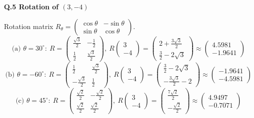 \medskip\noindent\textbf{Q.5  Rotation of $(3,-4)$}\par\smallskip
Rotation matrix $R_\theta=\begin{pmatrix}\cos\theta&-\sin\theta\\\sin\theta&\cos\theta\end{pmatrix}$.
\[ \text{(a) }\theta=30^\circ:\ R=\begin{pmatrix}\frac{\sqrt{3}}{2} & - \frac{1}{2} \\ \frac{1}{2} & \frac{\sqrt{3}}{2}\end{pmatrix},\ R\begin{pmatrix}3\\-4\end{pmatrix}=\begin{pmatrix}2 + \frac{3 \sqrt{3}}{2} \\ \frac{3}{2} - 2 \sqrt{3}\end{pmatrix}\approx\begin{pmatrix}4.5981\\-1.9641\end{pmatrix} \]
\[ \text{(b) }\theta=-60^\circ:\ R=\begin{pmatrix}\frac{1}{2} & \frac{\sqrt{3}}{2} \\ - \frac{\sqrt{3}}{2} & \frac{1}{2}\end{pmatrix},\ R\begin{pmatrix}3\\-4\end{pmatrix}=\begin{pmatrix}\frac{3}{2} - 2 \sqrt{3} \\ - \frac{3 \sqrt{3}}{2} - 2\end{pmatrix}\approx\begin{pmatrix}-1.9641\\-4.5981\end{pmatrix} \]
\[ \text{(c) }\theta=45^\circ:\ R=\begin{pmatrix}\frac{\sqrt{2}}{2} & - \frac{\sqrt{2}}{2} \\ \frac{\sqrt{2}}{2} & \frac{\sqrt{2}}{2}\end{pmatrix},\ R\begin{pmatrix}3\\-4\end{pmatrix}=\begin{pmatrix}\frac{7 \sqrt{2}}{2} \\ - \frac{\sqrt{2}}{2}\end{pmatrix}\approx\begin{pmatrix}4.9497\\-0.7071\end{pmatrix} \]
